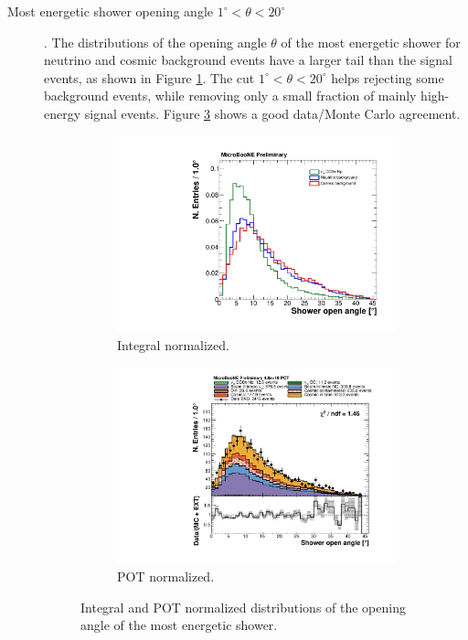 \begin{description}
\item[Most energetic shower opening angle $1^{\circ} < \theta < 20^{\circ}$]. The distributions of the opening angle $\theta$ of the most energetic shower for neutrino and cosmic background events have a larger tail than the signal events, as shown in Figure \ref{fig:open_integral}. The cut $1^{\circ} < \theta < 20^{\circ}$ helps rejecting some background events, while removing only a small fraction of mainly high-energy signal events. Figure \ref{fig:open_pot} shows a good data/Monte Carlo agreement.

\begin{figure}[htbp]
\centering
  \begin{subfigure}{0.45\textwidth}
    \includegraphics[width=\linewidth]{figures/h_shower_open_angle_norm.pdf}
    \caption{Integral normalized.} \label{fig:open_integral}
  \end{subfigure}
    \begin{subfigure}{0.45\textwidth}
    \includegraphics[width=\linewidth]{figures/h_shower_open_angle.pdf}
    \caption{POT normalized.} \label{fig:open_pot}
  \end{subfigure}
  \caption{Integral and POT normalized distributions of the opening angle of the most energetic shower.}
\end{figure}


\end{description}
